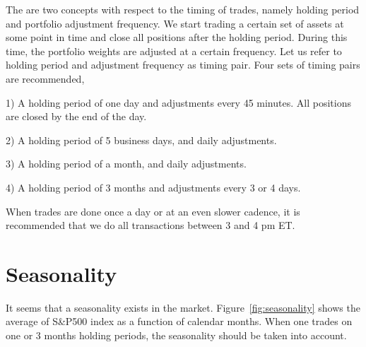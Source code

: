 \documentclass{article}
\begin{document}
The are two concepts with respect to the timing of trades, namely
holding period and portfolio adjustment frequency. We start trading a
certain set of assets at some point in time and close all positions
after the holding period. During this time, the portfolio weights are
adjusted at a certain frequency. Let us refer to holding period and
adjustment frequency as timing pair. Four sets of timing pairs are
recommended,

1) A holding period of one day and adjustments every 45 minutes. All
positions are closed by the end of the day.

2) A holding period of 5 business days, and daily adjustments.

3) A holding period of a month, and daily adjustments.

4) A holding period of 3 months and adjustments every 3 or 4 days.

When trades are done once a day or at an even slower cadence, it is
recommended that we do all transactions between 3 and 4 pm ET.

\section{Seasonality}\label{section:seasonality}

It seems that a seasonality exists in the
market. Figure~\ref{fig:seasonality} shows the average of S\&P500
index as a function of calendar months. When one trades on one or 3
months holding periods, the seasonality should be taken into account.
\end{document}
